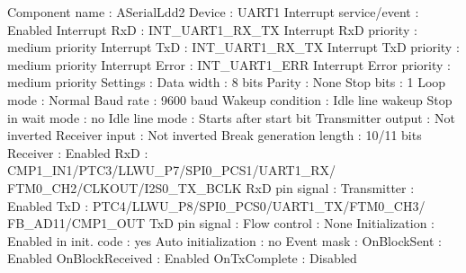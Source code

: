 \begin{DoxyCode}
            Component name                                 : ASerialLdd2
            Device                                         : UART1
            Interrupt service/\textcolor{keyword}{event}                        : Enabled
              Interrupt RxD                                : INT\_UART1\_RX\_TX
              Interrupt RxD priority                       : medium priority
              Interrupt TxD                                : INT\_UART1\_RX\_TX
              Interrupt TxD priority                       : medium priority
              Interrupt Error                              : INT\_UART1\_ERR
              Interrupt Error priority                     : medium priority
            Settings                                       : 
              Data width                                   : 8 bits
              Parity                                       : None
              Stop bits                                    : 1
              Loop mode                                    : Normal
              Baud rate                                    : 9600 baud
              Wakeup condition                             : Idle line wakeup
              Stop in wait mode                            : no
              Idle line mode                               : Starts after start bit
              Transmitter output                           : Not inverted
              Receiver input                               : Not inverted
              Break generation length                      : 10/11 bits
              Receiver                                     : Enabled
                RxD                                        : CMP1\_IN1/PTC3/LLWU\_P7/SPI0\_PCS1/UART1\_RX/
      FTM0\_CH2/CLKOUT/I2S0\_TX\_BCLK
                RxD pin signal                             : 
              Transmitter                                  : Enabled
                TxD                                        : PTC4/LLWU\_P8/SPI0\_PCS0/UART1\_TX/FTM0\_CH3/
      FB\_AD11/CMP1\_OUT
                TxD pin signal                             : 
              Flow control                                 : None
            Initialization                                 : 
              Enabled in init. code                        : yes
              Auto initialization                          : no
              Event mask                                   : 
                OnBlockSent                                : Enabled
                OnBlockReceived                            : Enabled
                OnTxComplete                               : Disabled

\end{DoxyCode}
